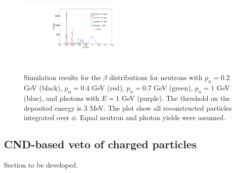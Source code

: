 \begin{figure}[htb]  
\begin{center}
\includegraphics[width=0.45\textwidth]{Figure/Figure42.pdf}
\caption {Simulation results for the $\beta$ distributions for neutrons with $p_n=0.2$ GeV (black), $p_n=0.4$ GeV (red), $p_n=0.7$ GeV (green), $p_n=1$ GeV (blue), and photons with $E=1$ GeV (purple). The threshold on the deposited energy is 3 MeV. The plot show all reconstructed particles integrated over $\phi$. Equal neutron and photon yields were assumed.}
\label{beta_n_g}
\end{center}
\end{figure}

\subsection{CND-based veto of charged particles}
Section to be developed.
